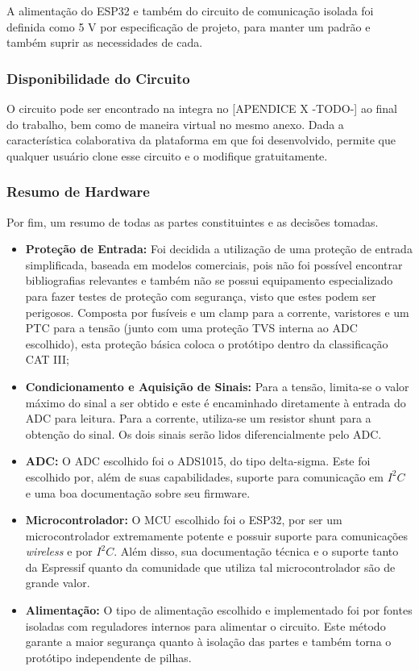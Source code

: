 A alimentação do ESP32 e também do circuito de comunicação isolada foi definida como 5 V por especificação de projeto, para manter um padrão e também suprir as necessidades de cada.

\subsubsection{Disponibilidade do Circuito}\label{availability}

O circuito pode ser encontrado na integra no [APENDICE X -TODO-] ao final do trabalho, bem como de maneira virtual no mesmo anexo. Dada a característica colaborativa da plataforma em que foi desenvolvido, permite que qualquer usuário clone esse circuito e o modifique gratuitamente.

\subsubsection{Resumo de Hardware}\label{resumo-hardware}

Por fim, um resumo de todas as partes constituintes e as decisões tomadas.

\begin{itemize}
    \item \textbf{Proteção de Entrada:} Foi decidida a utilização de uma proteção de entrada simplificada, baseada em modelos comerciais, pois não foi possível encontrar bibliografias relevantes e também não se possui equipamento especializado para fazer testes de proteção com segurança, visto que estes podem ser perigosos. Composta por fusíveis e um clamp para a corrente, varistores e um PTC para a tensão (junto com uma proteção TVS interna ao ADC escolhido), esta proteção básica coloca o protótipo dentro da classificação CAT III;
    \item \textbf{Condicionamento e Aquisição de Sinais:} Para a tensão, limita-se o valor máximo do sinal a ser obtido e este é encaminhado diretamente à entrada do ADC para leitura. Para a corrente, utiliza-se um resistor shunt para a obtenção do sinal. Os dois sinais serão lidos diferencialmente pelo ADC.
    \item \textbf{ADC:} O ADC escolhido foi o ADS1015, do tipo delta-sigma. Este foi escolhido por, além de suas capabilidades, suporte para comunicação em $I^2C$ e uma boa documentação sobre seu firmware.
    \item \textbf{Microcontrolador:} O MCU escolhido foi o ESP32, por ser um microcontrolador extremamente potente e possuir suporte para comunicações \textit{wireless} e por $I^2C$. Além disso, sua documentação técnica e o suporte tanto da Espressif quanto da comunidade que utiliza tal microcontrolador são de grande valor.
    \item \textbf{Alimentação:} O tipo de alimentação escolhido e implementado foi por fontes isoladas com reguladores internos para alimentar o circuito. Este método garante a maior segurança quanto à isolação das partes e também torna o protótipo independente de pilhas.
\end{itemize}

